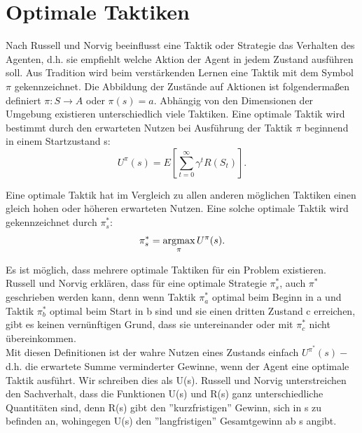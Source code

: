 \section{Optimale Taktiken}
\label{sec:Optimale Taktiken}
Nach Russell und Norvig \cite[757\psq]{Russell} beeinflusst eine Taktik oder Strategie das Verhalten des Agenten, d.h. sie empfiehlt welche Aktion der Agent in jedem Zustand ausführen soll. Aus Tradition wird beim verstärkenden Lernen eine Taktik mit dem Symbol $\pi$ gekennzeichnet. Die Abbildung der Zustände auf Aktionen ist folgendermaßen definiert $\pi : S \rightarrow A$ oder $\pi(s) = a$. Abhängig von den Dimensionen der Umgebung existieren unterschiedlich viele Taktiken. Eine optimale Taktik wird bestimmt durch den erwarteten Nutzen bei Ausführung der Taktik $\pi$ beginnend in einem Startzustand s:\\

\begin{equation}
\label{eq:Der erwartete Nutzen}
U^\pi(s) = E\left[\sum_{t=0}^{\infty} \gamma^t R(S_t)\right].
\end{equation}

Eine optimale Taktik hat im Vergleich zu allen anderen möglichen Taktiken einen gleich hohen oder höheren erwarteten Nutzen. Eine solche optimale Taktik wird gekennzeichnet durch $\pi^*_s$: \\ 

\begin{equation}
\pi^*_s = \operatorname*{arg\!\max}_\pi U^\pi(s).
\end{equation}

Es ist möglich, dass mehrere optimale Taktiken für ein Problem existieren. Russell und Norvig erklären, dass für eine optimale Strategie $\pi^*_s$, auch $\pi^*$ geschrieben werden kann, denn wenn Taktik $\pi^*_a$ optimal beim Beginn in a und Taktik $\pi^*_b$ optimal beim Start in b sind und sie einen dritten Zustand c erreichen, gibt es keinen vernünftigen Grund, dass sie untereinander oder mit $\pi^*_c$ nicht übereinkommen. \\

Mit diesen Definitionen ist der wahre Nutzen eines Zustands einfach $U^{\pi^*}(s) -$ d.h. die erwartete Summe verminderter Gewinne, wenn der Agent eine optimale Taktik ausführt. Wir schreiben dies als U(s). Russell und Norvig unterstreichen den Sachverhalt, dass die Funktionen U(s) und R(s) ganz unterschiedliche Quantitäten sind, denn R(s) gibt den ''kurzfristigen'' Gewinn, sich in s zu befinden an, wohingegen U(s) den ''langfristigen'' Gesamtgewinn ab s angibt.


